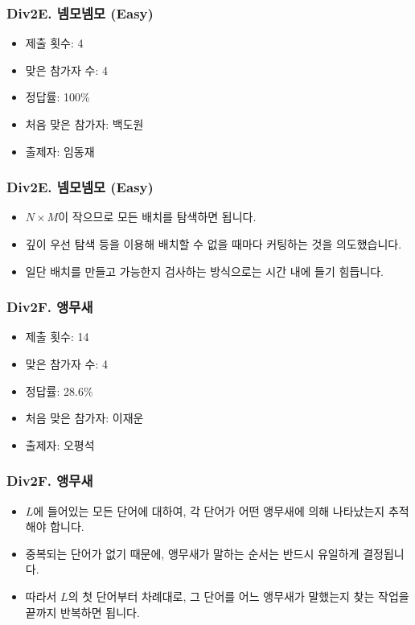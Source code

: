 \documentclass[xetex]{beamer}
\begin{document}
\begin{frame}
  \frametitle{Div2E. 넴모넴모 (Easy)}
  \begin{itemize}
    \item 제출 횟수: 4
    \item 맞은 참가자 수: 4
    \item 정답률: 100\%
    \item 처음 맞은 참가자: 백도원
    \item 출제자: 임동재
  \end{itemize}
\end{frame}

\begin{frame}
  \frametitle{Div2E. 넴모넴모 (Easy)}
  \begin{itemize}
    \item $N \times M$이 작으므로 모든 배치를 탐색하면 됩니다.
    \item 깊이 우선 탐색 등을 이용해 배치할 수 없을 때마다 커팅하는 것을 의도했습니다.
    \item 일단 배치를 만들고 가능한지 검사하는 방식으로는 시간 내에 들기 힘듭니다.
  \end{itemize}
\end{frame}

\begin{frame}
  \frametitle{Div2F. 앵무새}
  \begin{itemize}
    \item 제출 횟수: 14
    \item 맞은 참가자 수: 4
    \item 정답률: 28.6\%
    \item 처음 맞은 참가자: 이재운
    \item 출제자: 오평석
  \end{itemize}
\end{frame}

\begin{frame}
  \frametitle{Div2F. 앵무새}
  \begin{itemize}
    \item $L$에 들어있는 모든 단어에 대하여, 각 단어가 어떤 앵무새에 의해 나타났는지 추적해야 합니다.
    \item 중복되는 단어가 없기 때문에, 앵무새가 말하는 순서는 반드시 유일하게 결정됩니다.
    \item 따라서 $L$의 첫 단어부터 차례대로, 그 단어를 어느 앵무새가 말했는지 찾는 작업을 끝까지 반복하면 됩니다.
  \end{itemize}
\end{frame}
\end{document}
